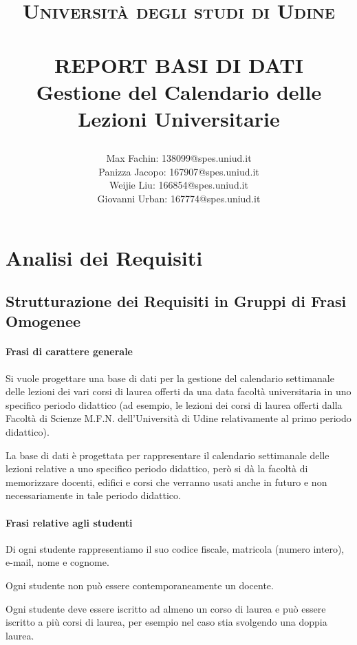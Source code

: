 \documentclass[a4paper,11pt]{article}
\title{
    \normalfont \normalsize 

    \textsc{Università degli studi di Udine} \\ [25pt]
    \horrule{0.5pt} \\[0.5cm]
    \huge REPORT BASI DI DATI \\[0.5cm]
    \large Gestione del Calendario delle Lezioni Universitarie
    \horrule{0.5pt} \\[0.5cm]
}
\begin{document}
\author{Max Fachin: 138099@spes.uniud.it\\ 
Panizza Jacopo: 167907@spes.uniud.it\\ 
Weijie Liu: 166854@spes.uniud.it\\ 
Giovanni Urban: 167774@spes.uniud.it}

\maketitle
\tableofcontents
\newpage

\section{Analisi dei Requisiti}
\subsection{Strutturazione dei Requisiti in Gruppi di Frasi Omogenee}


\paragraph{Frasi di carattere generale}

Si vuole progettare una base di dati per la gestione del calendario settimanale delle lezioni dei vari corsi di laurea offerti da una data facoltà universitaria in uno specifico periodo didattico (ad esempio, le lezioni dei corsi di laurea offerti dalla Facoltà di Scienze M.F.N. dell'Università di Udine relativamente al primo periodo didattico).

La base di dati è progettata per rappresentare il calendario settimanale delle lezioni relative a uno specifico periodo didattico, però si dà la facoltà di memorizzare docenti, edifici e corsi che verranno usati anche in futuro e non necessariamente in tale periodo didattico.


\paragraph{Frasi relative agli studenti}

Di ogni studente rappresentiamo il suo codice fiscale, matricola (numero intero), e-mail, nome e cognome.

Ogni studente non può essere contemporaneamente un docente.

Ogni studente deve essere iscritto ad almeno un corso di laurea e può essere iscritto a più corsi di laurea, per esempio nel caso stia svolgendo una doppia laurea.
\end{document}
